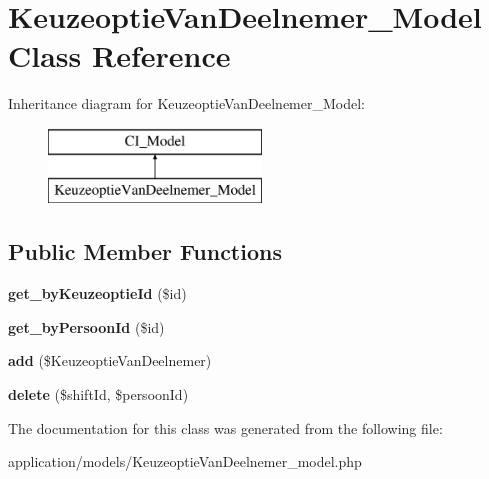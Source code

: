 \hypertarget{class_keuzeoptie_van_deelnemer___model}{}\section{Keuzeoptie\+Van\+Deelnemer\+\_\+\+Model Class Reference}
\label{class_keuzeoptie_van_deelnemer___model}
Inheritance diagram for Keuzeoptie\+Van\+Deelnemer\+\_\+\+Model\+:\begin{figure}[H]
\begin{center}
\leavevmode
\includegraphics[height=2.000000cm]{class_keuzeoptie_van_deelnemer___model}
\end{center}
\end{figure}
\subsection*{Public Member Functions}
\begin{DoxyCompactItemize}
\item 
\mbox{\label{class_keuzeoptie_van_deelnemer___model_a5240031a73a1db935718f12ab29d80ad}} 
{\bfseries get\+\_\+by\+Keuzeoptie\+Id} (\$id)
\item 
\mbox{\label{class_keuzeoptie_van_deelnemer___model_aa04bd86e024fed6b73b051c9cbb9ec52}} 
{\bfseries get\+\_\+by\+Persoon\+Id} (\$id)
\item 
\mbox{\label{class_keuzeoptie_van_deelnemer___model_a59e9964aa59737ee3789f9458fdc4ee2}} 
{\bfseries add} (\$Keuzeoptie\+Van\+Deelnemer)
\item 
\mbox{\label{class_keuzeoptie_van_deelnemer___model_a0b51c4f3d41dcc04514f7ea8405f4ed3}} 
{\bfseries delete} (\$shift\+Id, \$persoon\+Id)
\end{DoxyCompactItemize}


The documentation for this class was generated from the following file\+:\begin{DoxyCompactItemize}
\item 
application/models/Keuzeoptie\+Van\+Deelnemer\+\_\+model.\+php\end{DoxyCompactItemize}
